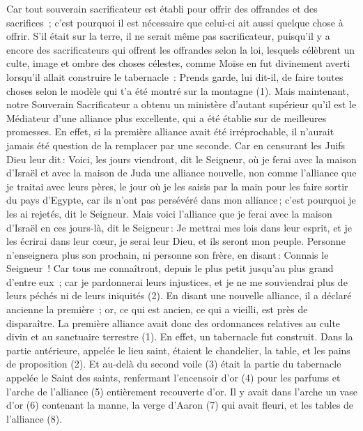 \begin{multicols}{2}
Car tout souverain sacrificateur est établi pour offrir des offrandes et des sacrifices ; c'est pourquoi il est nécessaire que celui-ci ait aussi quelque chose à offrir.
S’il était sur la terre, il ne serait même pas sacrificateur, puisqu’il y a encore des sacrificateurs qui offrent les offrandes selon la loi,
lesquels célèbrent un culte, image et ombre des choses célestes, comme Moïse en fut divinement averti lorsqu’il allait construire le tabernacle : Prends garde, lui dit-il, de faire toutes choses selon le modèle qui t'a été montré sur la montagne (1).
Mais maintenant, notre Souverain Sacrificateur a obtenu un ministère d'autant supérieur qu'il est le Médiateur d'une alliance plus excellente, qui a été établie sur de meilleures promesses.
En effet, si la première alliance avait été irréprochable, il n’aurait jamais été question de la remplacer par une seconde.
Car en censurant les Juifs Dieu leur dit : Voici, les jours viendront, dit le Seigneur, où je ferai avec la maison d'Israël et avec la maison de Juda une alliance nouvelle,
non comme l'alliance que je traitai avec leurs pères, le jour où je les saisis par la main pour les faire sortir du pays d'Egypte, car ils n'ont pas persévéré dans mon alliance ; c'est pourquoi je les ai rejetés, dit le Seigneur.
Mais voici l'alliance que je ferai avec la maison d'Israël en ces jours-là, dit le Seigneur : Je mettrai mes lois dans leur esprit, et je les écrirai dans leur cœur, je serai leur Dieu, et ils seront mon peuple.
Personne n'enseignera plus son prochain, ni personne son frère, en disant : Connais le Seigneur ! Car tous me connaîtront, depuis le plus petit jusqu'au plus grand d'entre eux ;
car je pardonnerai leurs injustices, et je ne me souviendrai plus de leurs péchés ni de leurs iniquités (2).
En disant une nouvelle alliance, il a déclaré ancienne la première ; or, ce qui est ancien, ce qui a vieilli, est près de disparaître.
\VerseOne{}La première alliance avait donc des ordonnances relatives au culte divin et au sanctuaire terrestre (1).
En effet, un tabernacle fut construit. Dans la partie antérieure, appelée le lieu saint, étaient le chandelier, la table, et les pains de proposition (2).
Et au-delà du second voile (3) était la partie du tabernacle appelée le Saint des saints,
renfermant l’encensoir d'or (4) pour les parfums et l'arche de l'alliance (5) entièrement recouverte d'or. Il y avait dans l’arche un vase d'or (6) contenant la manne, la verge d'Aaron (7) qui avait fleuri, et les tables de l'alliance (8).

\end{multicols}
